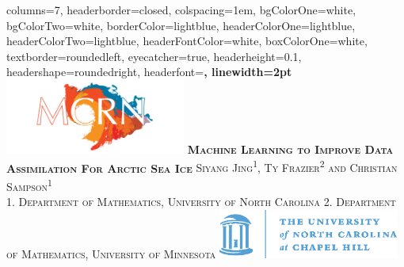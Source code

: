 \documentclass[landscape,a0paper,fontscale=0.3]{baposter} %
\begin{document}
\begin{poster}
{
columns=7,
headerborder=closed, %
colspacing=1em, %
bgColorOne=white, %
bgColorTwo=white, %
borderColor=lightblue, %
headerColorOne=lightblue,%
headerColorTwo=lightblue,%
headerFontColor=white, %
boxColorOne=white, %
textborder=roundedleft, %
eyecatcher=true, %
headerheight=0.1\textheight, %
headershape=roundedright, %
headerfont=\Large\bf\textsc, %
linewidth=2pt %
}
%
{\includegraphics[width=16em]{mcrn-logo.png}} %
{\bf\textsc{Machine Learning to Improve Data Assimilation For Arctic Sea Ice}\vspace{0.5em}} %
{\textsc{Siyang Jing\textsuperscript{1}, Ty Frazier\textsuperscript{2} and Christian Sampson\textsuperscript{1}\\1. Department of Mathematics, University of North Carolina  2. Department of Mathematics, University of Minnesota}} %
{\includegraphics[width=16em]{oldwell_cmyk.eps}} %


\end{poster}
\end{document}
